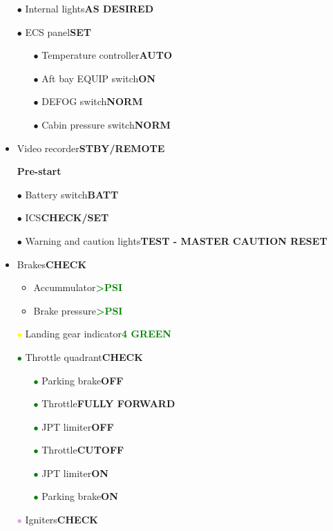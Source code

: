 \documentclass[a4paper,12pt,dvipsnames]{letter}
\newcommand{\button}[1]{\textbf{#1}}
\newcommand{\ok}[1]{\textcolor{Green}{\textbf{#1}}}
\newcommand{\bi}{\textcolor{ProcessBlue}{$\bullet$\;}}
\newcommand{\gi}{\textcolor{Green}{$\bullet$\;}}
\newcommand{\yi}{\textcolor{Yellow}{$\bullet$\;}}
\newcommand{\vi}{\textcolor{Plum}{$\bullet$\;}}
\begin{document}
{\begin{itemize}
\item[\bi] Internal lights\dotfill\button{AS DESIRED}
\item[\bi] ECS panel\dotfill\button{SET}
\begin{itemize}
 \item[\bi] Temperature controller\dotfill\button{AUTO}
 \item[\bi] Aft bay EQUIP switch\dotfill\button{ON}
 \item[\bi] DEFOG switch\dotfill\button{NORM}
 \item[\bi] Cabin pressure switch\dotfill\button{NORM}
\end{itemize}
\item Video recorder\dotfill\button{STBY/REMOTE}
\end{itemize}
\newpage
\begin{itemize}
\item[] {\LARGE\textbf{Pre-start}}
\item[\bi] Battery switch\dotfill\button{BATT}
\item[\bi] ICS\dotfill\button{CHECK/SET}
\item[\bi] Warning and caution lights\dotfill\button{TEST - MASTER CAUTION RESET}
\item Brakes\dotfill\button{CHECK}
\begin{itemize}
 \item Accummulator\dotfill\ok{>\;PSI}
 \item Brake pressure\dotfill\ok{>\;PSI}
\end{itemize}
\item[\yi] Landing gear indicator\dotfill\ok{4 GREEN}
\item[\gi] Throttle quadrant\dotfill\button{CHECK}
\begin{itemize}
 \item[\gi] Parking brake\dotfill\button{OFF}
 \item[\gi] Throttle\dotfill\button{FULLY FORWARD}
 \item[\gi] JPT limiter\dotfill\button{OFF}
 \item[\gi] Throttle\dotfill\button{CUTOFF}
 \item[\gi] JPT limiter\dotfill\button{ON}
 \item[\gi] Parking brake\dotfill\button{ON}
\end{itemize}
\item[\vi] Igniters\dotfill\button{CHECK}
\begin{itemize}

\end{itemize}
\end{itemize}}
\end{document}
